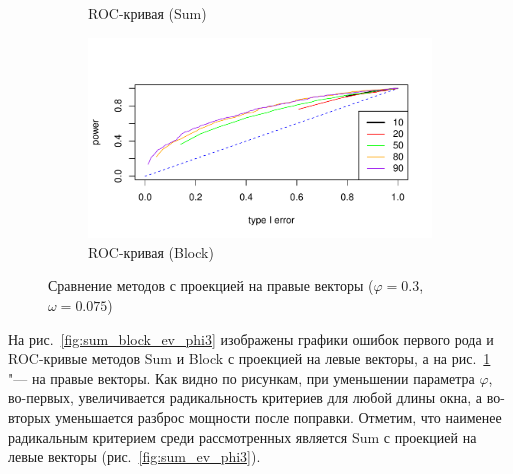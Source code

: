 \documentclass[specialist,
substylefile = spbu_report.rtx,
subf,href,colorlinks=true, 12pt]{disser}
\theoremstyle{definition}
\begin{document}
\begin{figure}[h!]
\begin{subfigure}[t]{0.5\textwidth}
		\caption{ROC-кривая (Sum)}
	\end{subfigure}\hspace{\fill}
	\begin{subfigure}[t]{0.5\textwidth}
		\centering
		\includegraphics[width=\textwidth]{img/roc_block_fa_phi3_omega0075.pdf}
		\caption{ROC-кривая (Block)}
	\end{subfigure}
	\caption{Сравнение методов с проекцией на правые векторы ($\varphi=0.3$, $\omega=0.075$)}
	\label{fig:sum_block_fa_phi3}
\end{figure}

На рис.~\ref{fig:sum_block_ev_phi3} изображены графики ошибок первого рода и ROC-кривые методов Sum и Block с проекцией на левые векторы, а на рис.~\ref{fig:sum_block_fa_phi3} "--- на правые векторы. Как видно по рисункам, при уменьшении параметра $\varphi$, во-первых, увеличивается радикальность критериев для любой длины окна, а во-вторых уменьшается разброс мощности после поправки. Отметим, что наименее радикальным критерием среди рассмотренных является Sum с проекцией на левые векторы (рис.~\ref{fig:sum_ev_phi3}).


\end{document}
